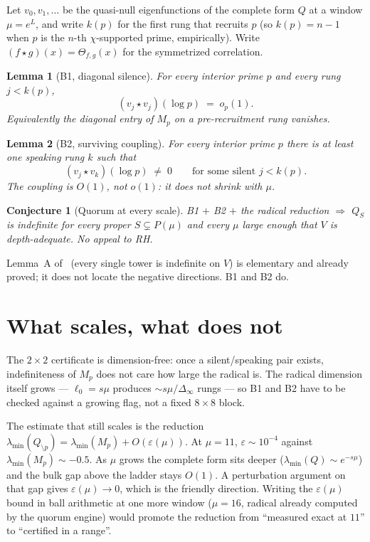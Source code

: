 \documentclass[10pt]{article}
\newtheorem{lemma}{Lemma}
\newtheorem{conjecture}{Conjecture}
\begin{document}
Let $v_0,v_1,\dots$ be the quasi-null eigenfunctions of the complete
form $Q$ at a window $\mu=e^L$, and write
$k(p)$ for the first rung that recruits $p$ (so $k(p)=n-1$ when $p$
is the $n$-th $\chi$-supported prime, empirically). Write
$(f\star g)(x)=\Theta_{f,g}(x)$ for the symmetrized correlation.

\begin{lemma}[B1, diagonal silence]\label{lem:B1}
For every interior prime $p$ and every rung $j<k(p)$,
\[
(v_j\star v_j)(\log p)\;=\;o_p(1).
\]
Equivalently the diagonal entry of $M_p$ on a pre-recruitment rung
vanishes.
\end{lemma}

\begin{lemma}[B2, surviving coupling]\label{lem:B2}
For every interior prime $p$ there is at least one speaking rung $k$
such that
\[
(v_j\star v_k)(\log p)\;\ne\;0
\qquad\text{for some silent }j<k(p).
\]
The coupling is $O(1)$, not $o(1)$: it does not shrink with $\mu$.
\end{lemma}

\begin{conjecture}[Quorum at every scale]
B1 $+$ B2 $+$ the radical reduction $\Rightarrow$ $Q_S$ is indefinite
for every proper $S\subsetneq P(\mu)$ and every $\mu$ large enough
that $V$ is depth-adequate. No appeal to RH.
\end{conjecture}

Lemma~A of~\cite{Quorum} (every single tower is indefinite on $V$) is
elementary and already proved; it does not locate the negative
directions. B1 and B2 do.

\section{What scales, what does not}

The $2\times2$ certificate is dimension-free: once a silent/speaking
pair exists, indefiniteness of $M_p$ does not care how large the
radical is. The radical dimension itself grows --- $\ell_0=s\mu$
produces $\sim s\mu/\Delta_\infty$ rungs --- so B1 and B2 have to be
checked against a growing flag, not a fixed $8\times8$ block.

The estimate that still scales is the reduction
$\lambda_{\min}(Q_{\setminus p})=\lambda_{\min}(M_p)+O(\varepsilon(\mu))$.
At $\mu=11$, $\varepsilon\sim10^{-4}$ against
$\lambda_{\min}(M_p)\sim-0.5$. As $\mu$ grows the complete form sits
deeper ($\lambda_{\min}(Q)\sim e^{-s\mu}$) and the bulk gap above the
ladder stays $O(1)$. A perturbation argument on that gap gives
$\varepsilon(\mu)\to0$, which is the friendly direction. Writing the
$\varepsilon(\mu)$ bound in ball arithmetic at one more window
($\mu=16$, radical already computed by the quorum engine) would
promote the reduction from ``measured exact at $11$'' to ``certified
in a range''.
\end{document}
